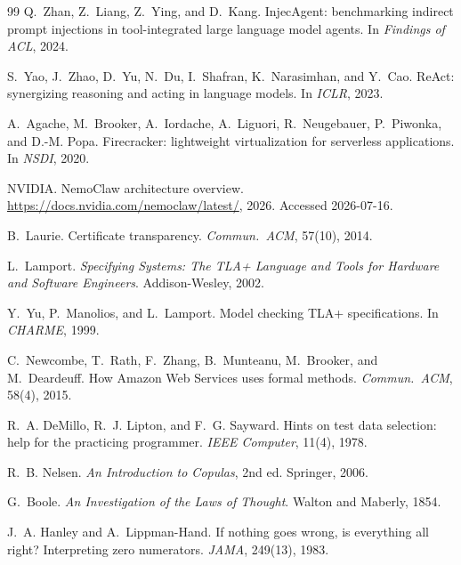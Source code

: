 \documentclass[10pt,twocolumn,letterpaper]{article}
\begin{document}
\begin{thebibliography}{99}
Q.~Zhan, Z.~Liang, Z.~Ying, and D.~Kang.
InjecAgent: benchmarking indirect prompt injections in tool-integrated
large language model agents.
In \emph{Findings of ACL}, 2024.

S.~Yao, J.~Zhao, D.~Yu, N.~Du, I.~Shafran, K.~Narasimhan, and Y.~Cao.
ReAct: synergizing reasoning and acting in language models.
In \emph{ICLR}, 2023.

A.~Agache, M.~Brooker, A.~Iordache, A.~Liguori, R.~Neugebauer, P.~Piwonka,
and D.-M. Popa.
Firecracker: lightweight virtualization for serverless applications.
In \emph{NSDI}, 2020.

NVIDIA.
NemoClaw architecture overview.
\url{https://docs.nvidia.com/nemoclaw/latest/}, 2026.
Accessed 2026-07-16.

B.~Laurie.
Certificate transparency.
\emph{Commun.\ ACM}, 57(10), 2014.

L.~Lamport.
\emph{Specifying Systems: The TLA+ Language and Tools for Hardware and
Software Engineers}.
Addison-Wesley, 2002.

Y.~Yu, P.~Manolios, and L.~Lamport.
Model checking TLA+ specifications.
In \emph{CHARME}, 1999.

C.~Newcombe, T.~Rath, F.~Zhang, B.~Munteanu, M.~Brooker, and M.~Deardeuff.
How Amazon Web Services uses formal methods.
\emph{Commun.\ ACM}, 58(4), 2015.

R.~A. DeMillo, R.~J. Lipton, and F.~G. Sayward.
Hints on test data selection: help for the practicing programmer.
\emph{IEEE Computer}, 11(4), 1978.

R.~B. Nelsen.
\emph{An Introduction to Copulas}, 2nd ed.
Springer, 2006.

G.~Boole.
\emph{An Investigation of the Laws of Thought}.
Walton and Maberly, 1854.

J.~A. Hanley and A.~Lippman-Hand.
If nothing goes wrong, is everything all right? Interpreting zero
numerators.
\emph{JAMA}, 249(13), 1983.

\end{thebibliography}
\end{document}
